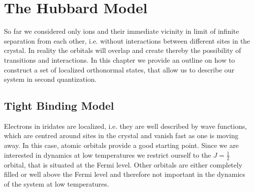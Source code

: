
\newpage
\section{The Hubbard Model}

So far we considered only ions and their immediate vicinity in limit of infinite separation from each other, i.e. without interactions between different sites in the crystal.
In reality the orbitals will overlap and create thereby the possibility of transitions and interactions.
In this chapter we provide an outline on how to construct a set of localized orthonormal states, that allow us to describe our system in second quantization.


\subsection{Tight Binding Model} %

Electrons in iridates are localized, i.e. they are well described by wave functions, which are centred around sites in the crystal and vanish fast as one is moving away. 
In this case, atomic orbitals provide a good starting point. 
Since we are interested in dynamics at low temperatures we restrict ourself to the $J=\frac12$ orbital, that is situated at the Fermi level. 
Other orbitals are either completely filled or well above the Fermi level and therefore not important in the dynamics of the system at low temperatures.


